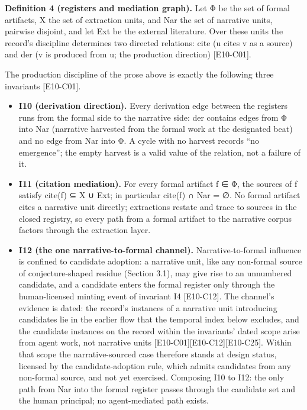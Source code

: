 \documentclass[
  11pt,
]{article}
\begin{document}
\textbf{Definition 4 (registers and mediation graph).} Let Φ be the set
of formal artifacts, X the set of extraction units, and Nar the set of
narrative units, pairwise disjoint, and let Ext be the external
literature. Over these units the record's discipline determines two
directed relations: cite (u cites v as a source) and der (v is produced
from u; the production direction) {[}E10-C01{]}.

The production discipline of the prose above is exactly the following
three invariants {[}E10-C01{]}.

\begin{itemize}
\item
  \textbf{I10 (derivation direction).} Every derivation edge between the
  registers runs from the formal side to the narrative side: der
  contains edges from Φ into Nar (narrative harvested from the formal
  work at the designated beat) and no edge from Nar into Φ. A cycle with
  no harvest records ``no emergence''; the empty harvest is a valid
  value of the relation, not a failure of it.
\item
  \textbf{I11 (citation mediation).} For every formal artifact f ∈ Φ,
  the sources of f satisfy cite(f) ⊆ X ∪ Ext; in particular cite(f) ∩
  Nar = ∅. No formal artifact cites a narrative unit directly;
  extractions restate and trace to sources in the closed registry, so
  every path from a formal artifact to the narrative corpus factors
  through the extraction layer.
\item
  \textbf{I12 (the one narrative-to-formal channel).}
  Narrative-to-formal influence is confined to candidate adoption: a
  narrative unit, like any non-formal source of conjecture-shaped
  residue (Section 3.1), may give rise to an unnumbered candidate, and a
  candidate enters the formal register only through the human-licensed
  minting event of invariant I4 {[}E10-C12{]}. The channel's evidence is
  dated: the record's instances of a narrative unit introducing
  candidates lie in the earlier flow that the temporal index below
  excludes, and the candidate instances on the record within the
  invariants' dated scope arise from agent work, not narrative units
  {[}E10-C01{]}{[}E10-C12{]}{[}E10-C25{]}. Within that scope the
  narrative-sourced case therefore stands at design status, licensed by
  the candidate-adoption rule, which admits candidates from any
  non-formal source, and not yet exercised. Composing I10 to I12: the
  only path from Nar into the formal register passes through the
  candidate set and the human principal; no agent-mediated path exists.
\end{itemize}
\end{document}
